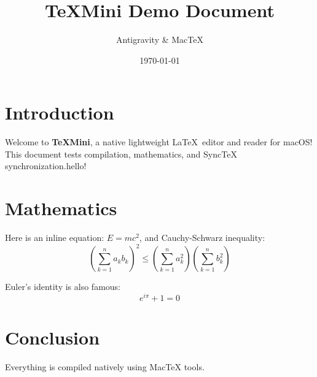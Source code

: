 \documentclass{article}
\title{TeXMini Demo Document}
\author{Antigravity \& MacTeX}
\date{\today}
\begin{document}
\maketitle

\section{Introduction}
Welcome to \textbf{TeXMini}, a native lightweight \LaTeX\ editor and reader for macOS!
This document tests compilation, mathematics, and SyncTeX synchronization.hello!

\section{Mathematics}
Here is an inline equation: $E = mc^2$, and Cauchy-Schwarz inequality:
\begin{equation}
\left( \sum_{k=1}^n a_k b_k \right)^2 \leq \left( \sum_{k=1}^n a_k^2 \right) \left( \sum_{k=1}^n b_k^2 \right)
\end{equation}

Euler's identity is also famous:
\begin{equation}
e^{i\pi} + 1 = 0
\end{equation}

\section{Conclusion}
Everything is compiled natively using MacTeX tools.
\end{document}
